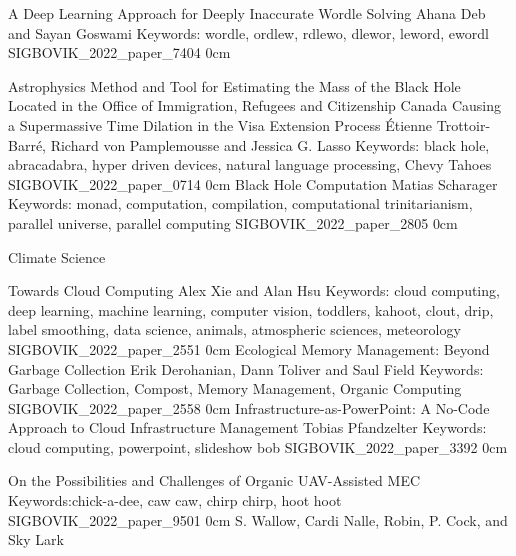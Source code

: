 \addpaper
    {A Deep Learning Approach for Deeply Inaccurate Wordle Solving}
    {Ahana Deb and Sayan Goswami}
    {Keywords: wordle, ordlew, rdlewo, dlewor, leword, ewordl}
    {SIGBOVIK_2022_paper_7404}
    {0cm}
    {}

\addtrack
    {}{Astrophysics}
\addpaper
    {Method and Tool for Estimating the Mass of the Black Hole Located in the Office of Immigration, Refugees and Citizenship Canada Causing a Supermassive Time Dilation in the Visa Extension Process}
    {Étienne Trottoir-Barré, Richard von Pamplemousse and Jessica G. Lasso}
    {Keywords: black hole, abracadabra, hyper driven devices, natural language processing, Chevy Tahoes}
    {SIGBOVIK_2022_paper_0714}
    {0cm}
    {}
\addpaper
    {Black Hole Computation}
    {Matias Scharager}
    {Keywords: monad, computation, compilation, computational trinitarianism, parallel universe, parallel computing}
    {SIGBOVIK_2022_paper_2805}
    {0cm}
    {}

\addtrack
    {}{Climate Science}

\addpaper
    {Towards Cloud Computing}
    {Alex Xie and Alan Hsu}
    {Keywords: cloud computing, deep learning, machine learning, computer vision, toddlers, kahoot, clout, drip, label smoothing, data science, animals, atmospheric sciences, meteorology}
    {SIGBOVIK_2022_paper_2551}
    {0cm}
    {}
\addpaper
    {Ecological Memory Management: Beyond Garbage Collection}
    {Erik Derohanian, Dann Toliver and Saul Field}
    {Keywords: Garbage Collection, Compost, Memory Management, Organic Computing}
    {SIGBOVIK_2022_paper_2558}
    {0cm}
    {}
\addpaper
    {Infrastructure-as-PowerPoint: A No-Code Approach to Cloud Infrastructure Management}
    {Tobias Pfandzelter}
    {Keywords: cloud computing, powerpoint, slideshow bob}
    {SIGBOVIK_2022_paper_3392}
    {0cm}
    {}

\addpaper
    {On the Possibilities and Challenges of Organic UAV-Assisted MEC}
    {}
    {Keywords:chick-a-dee, caw caw, chirp chirp, hoot hoot}
    {SIGBOVIK_2022_paper_9501}
    {0cm}
    {S. Wallow, Cardi Nalle, Robin, P. Cock, and Sky Lark}

